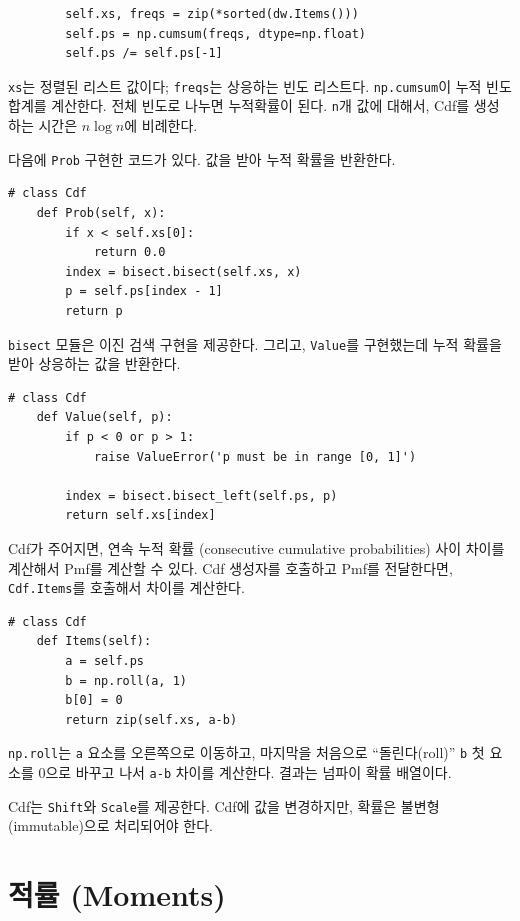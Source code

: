 \begin{verbatim}
        self.xs, freqs = zip(*sorted(dw.Items()))
        self.ps = np.cumsum(freqs, dtype=np.float)
        self.ps /= self.ps[-1]
\end{verbatim}

{\tt xs}는 정렬된 리스트 값이다; {\tt freqs}는 상응하는 빈도 리스트다. {\tt np.cumsum}이 누적 빈도 합계를 계산한다. 
전체 빈도로 나누면 누적확률이 된다.
{\tt n}개 값에 대해서, Cdf를 생성하는 시간은 $n \log n$에 비례한다.

다음에 {\tt Prob} 구현한 코드가 있다. 값을 받아 누적 확률을 반환한다.

\begin{verbatim}
# class Cdf
    def Prob(self, x):
        if x < self.xs[0]:
            return 0.0
        index = bisect.bisect(self.xs, x)
        p = self.ps[index - 1]
        return p
\end{verbatim}

{\tt bisect} 모듈은 이진 검색 구현을 제공한다.
그리고, {\tt Value}를 구현했는데 누적 확률을 받아 상응하는 값을 반환한다.

\begin{verbatim}
# class Cdf
    def Value(self, p):
        if p < 0 or p > 1:
            raise ValueError('p must be in range [0, 1]')

        index = bisect.bisect_left(self.ps, p)
        return self.xs[index]
\end{verbatim}

Cdf가 주어지면, 연속 누적 확률 (consecutive cumulative probabilities) 사이 차이를 계산해서 Pmf를 계산할 수 있다.
Cdf 생성자를 호출하고 Pmf를 전달한다면, 
{\tt Cdf.Items}를 호출해서 차이를 계산한다.


\begin{verbatim}
# class Cdf
    def Items(self):
        a = self.ps
        b = np.roll(a, 1)
        b[0] = 0
        return zip(self.xs, a-b)
\end{verbatim}

{\tt np.roll}는 {\tt a} 요소를 오른쪽으로 이동하고,
마지막을 처음으로 ``돌린다(roll)''
{\tt b} 첫 요소를 0으로 바꾸고 나서 {\tt a-b} 차이를 계산한다.
결과는 넘파이 확률 배열이다. 

Cdf는 {\tt Shift}와 {\tt Scale}를 제공한다. 
Cdf에 값을 변경하지만, 확률은 불변형(immutable)으로 처리되어야 한다.

\section{적률 (Moments)}

